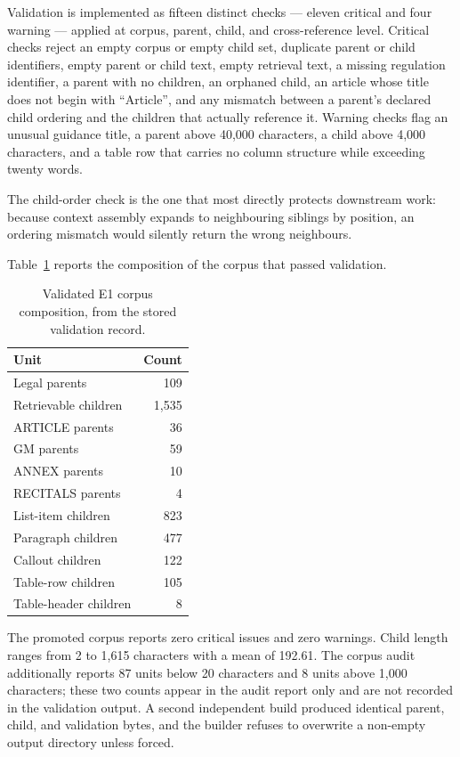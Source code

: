 Validation is implemented as fifteen distinct checks --- eleven critical and four warning --- applied at corpus, parent, child, and cross-reference level. Critical checks reject an empty corpus or empty child set, duplicate parent or child identifiers, empty parent or child text, empty retrieval text, a missing regulation identifier, a parent with no children, an orphaned child, an article whose title does not begin with ``Article'', and any mismatch between a parent's declared child ordering and the children that actually reference it. Warning checks flag an unusual guidance title, a parent above 40{,}000 characters, a child above 4{,}000 characters, and a table row that carries no column structure while exceeding twenty words.

The child-order check is the one that most directly protects downstream work: because context assembly expands to neighbouring siblings by position, an ordering mismatch would silently return the wrong neighbours.

Table~\ref{tab:e1-corpus} reports the composition of the corpus that passed validation.

\begin{table}[htbp]
  \centering
  \caption{Validated E1 corpus composition, from the stored validation record.}
  \label{tab:e1-corpus}
  \begin{tabular}{lr}
    \toprule
    \textbf{Unit} & \textbf{Count} \\
    \midrule
    Legal parents & 109 \\
    Retrievable children & 1,535 \\
    \midrule
    ARTICLE parents & 36 \\
    GM parents & 59 \\
    ANNEX parents & 10 \\
    RECITALS parents & 4 \\
    \midrule
    List-item children & 823 \\
    Paragraph children & 477 \\
    Callout children & 122 \\
    Table-row children & 105 \\
    Table-header children & 8 \\
    \bottomrule
  \end{tabular}
\end{table}

The promoted corpus reports zero critical issues and zero warnings. Child length ranges from 2 to 1{,}615 characters with a mean of 192.61. The corpus audit additionally reports 87 units below 20 characters and 8 units above 1{,}000 characters; these two counts appear in the audit report only and are not recorded in the validation output. A second independent build produced identical parent, child, and validation bytes, and the builder refuses to overwrite a non-empty output directory unless forced.

